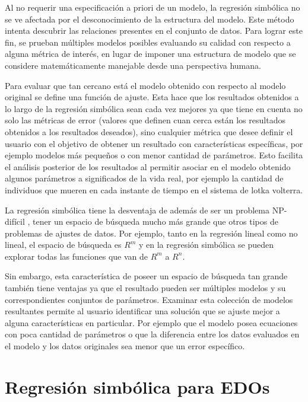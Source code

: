 Al no requerir una especificación a priori de un modelo, la regresión simbólica no se ve afectada por el desconocimiento de la estructura del modelo. Este método intenta descubrir las relaciones presentes en el conjunto de datos. Para lograr este fin, se prueban múltiples modelos posibles evaluando su calidad con respecto a alguna métrica de interés, en lugar de imponer una estructura de modelo que se considere matemáticamente manejable desde una perspectiva humana.

Para evaluar que tan cercano está el modelo obtenido con respecto al modelo original se define una función de ajuste. Esta hace que los resultados obtenidos a lo largo de la regresión simbólica sean cada vez mejores ya que tiene en cuenta no solo las métricas de error (valores que definen cuan cerca están los resultados obtenidos a los resultados deseados), sino cualquier métrica que desee definir el usuario con el objetivo de obtener un resultado con características específicas, por ejemplo modelos más pequeños o con menor cantidad de parámetros. Esto facilita el análisis posterior de los resultados al permitir asociar en el modelo obtenido algunos parámetros a significados de la vida real, por ejemplo la cantidad de individuos que mueren en cada instante de tiempo en el sistema de lotka volterra.

La regresión simbólica tiene la desventaja de además de ser un problema NP-difícil \cite{virgolin2022symbolic}, tener un espacio de búsqueda mucho más grande que otros tipos de problemas de ajustes de datos. Por ejemplo, tanto en la regresión lineal como no lineal, el espacio de búsqueda es $R^m$ y en la regresión simbólica se pueden explorar todas las funciones que van de $R^m$ a $R^n$.

Sin embargo, esta característica de poseer un espacio de búsqueda tan grande también tiene ventajas ya que el resultado pueden ser múltiples modelos y su correspondientes conjuntos de parámetros. Examinar esta colección de modelos resultantes permite al usuario identificar una solución que se ajuste mejor a alguna características en particular. Por ejemplo que el modelo posea ecuaciones con poca cantidad de parámetros o que la diferencia entre los datos evaluados en el modelo y los datos originales sea menor que un error específico.


\section{Regresión simbólica para EDOs}

